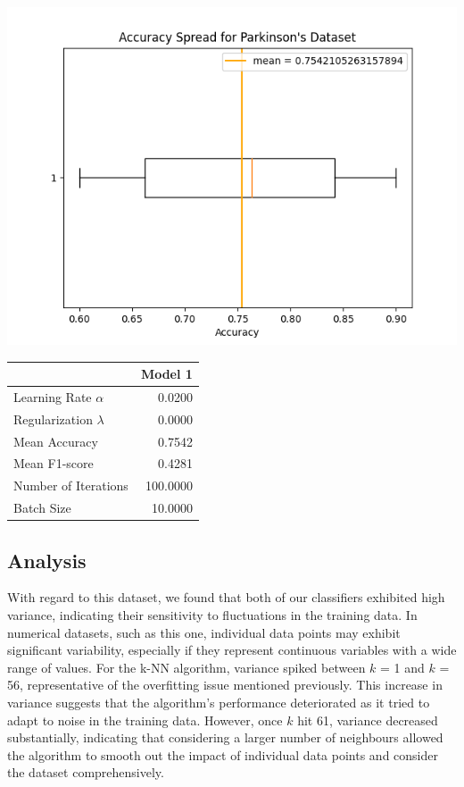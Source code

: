\documentclass{article}
\begin{document}
\begin{minipage}{0.49\textwidth}
    \centering
    \includegraphics*[width=\textwidth]{./src/figures/Parkinson's Dataset_variant.png}
\end{minipage}
\hfill
\begin{minipage}{0.49\textwidth}
    \centering
    \begin{tabular}{lr}
        \toprule
         & Model 1 \\
        \midrule
        Learning Rate $\alpha$ & 0.0200 \\
        Regularization $\lambda$ & 0.0000 \\
        Mean Accuracy & 0.7542 \\
        Mean F1-score & 0.4281 \\
        Number of Iterations & 100.0000 \\
        Batch Size & 10.0000 \\
        \bottomrule
        \end{tabular}
\end{minipage}

\subsection*{Analysis}
With regard to this dataset, we found that both of our classifiers exhibited high variance, 
indicating their sensitivity to fluctuations in the training data.
In numerical datasets, such as this one, individual data points may exhibit significant variability, 
especially if they represent continuous variables with a wide range of values.
For the k-NN algorithm, variance spiked between $k$ = 1 and $k$ = 56,
representative of the overfitting issue mentioned previously.
This increase in variance suggests that the algorithm's performance deteriorated
as it tried to adapt to noise in the training data.
However, once $k$ hit 61, variance decreased substantially, 
indicating that considering a larger number of neighbours allowed the algorithm 
to smooth out the impact of individual data points and consider the dataset comprehensively.
\\
\end{document}
